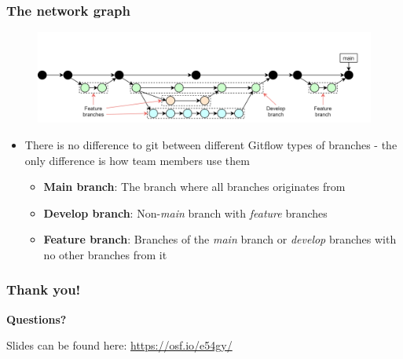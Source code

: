 \documentclass[aspectratio=169]{beamer} %
\begin{document}
\begin{frame}
	\frametitle{The network graph}

	\vspace{-.5cm}
	\begin{minipage}[t][5cm][t]{\textwidth}
		\begin{figure}
			\centering
			\includegraphics[width=\textwidth]{./img/dime-gitflow-network-names.png}
		\end{figure}
	\end{minipage}

	\vspace{-1cm}
	\begin{minipage}[t][5cm][t]{\textwidth}
		\begin{itemize}
			\setlength\itemsep{.4em}
			\item There is no difference to git between
			different Gitflow types of branches
			- the only difference is how team members use them
			\begin{itemize}
				\setlength\itemsep{.5em}
				\item \textbf{Main branch}:
				The branch where all branches originates from
				\item \textbf{Develop branch}:
				Non-\textit{main} branch with \textit{feature} branches
				\item \textbf{Feature branch}:
				Branches of the \textit{main} branch or
				\textit{develop} branches with no other branches from it
			\end{itemize}
		\end{itemize}
	\end{minipage}
\end{frame}




\begin{frame}
	\frametitle{Thank you!}
	\huge\centering \textbf{Questions?}

	\vspace{1cm}
	\normalsize Slides can be found here: \url{https://osf.io/e54gy/}
\end{frame}


\end{document}
